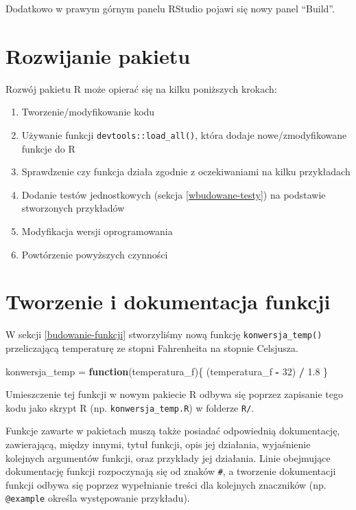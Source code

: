 \documentclass[paper=6in:9in,pagesize=pdftex,headinclude=on,footinclude=on,10pt]{scrbook}
\newenvironment{Shaded}{\begin{snugshade}}{\end{snugshade}}
\newcommand{\ControlFlowTok}[1]{\textcolor[rgb]{0.13,0.29,0.53}{\textbf{#1}}}
\newcommand{\DecValTok}[1]{\textcolor[rgb]{0.00,0.00,0.81}{#1}}
\newcommand{\FloatTok}[1]{\textcolor[rgb]{0.00,0.00,0.81}{#1}}
\newcommand{\NormalTok}[1]{#1}
\newcommand{\OperatorTok}[1]{\textcolor[rgb]{0.81,0.36,0.00}{\textbf{#1}}}
\newcommand{\StringTok}[1]{\textcolor[rgb]{0.31,0.60,0.02}{#1}}
\providecommand{\tightlist}{%
  \setlength{\itemsep}{0pt}\setlength{\parskip}{0pt}}
\begin{document}
Dodatkowo w prawym górnym panelu RStudio pojawi się nowy panel ``Build''.

\hypertarget{rozwijanie-pakietu}{%
\section{Rozwijanie pakietu}\label{rozwijanie-pakietu}}

Rozwój pakietu R może opierać się na kilku poniższych krokach:

\begin{enumerate}
\def\labelenumi{\arabic{enumi}.}
\tightlist
\item
  Tworzenie/modyfikowanie kodu
\item
  Używanie funkcji \texttt{devtools::load\_all()}, która dodaje nowe/zmodyfikowane funkcje do R
\item
  Sprawdzenie czy funkcja działa zgodnie z oczekiwaniami na kilku przykładach
\item
  Dodanie testów jednostkowych (sekcja \ref{wbudowane-testy}) na podstawie stworzonych przykładów
\item
  Modyfikacja wersji oprogramowania
\item
  Powtórzenie powyższych czynności
\end{enumerate}

\hypertarget{tworzenie-i-dokumentacja-funkcji}{%
\section{Tworzenie i dokumentacja funkcji}\label{tworzenie-i-dokumentacja-funkcji}}

W sekcji \ref{budowanie-funkcji} stworzyliśmy nową funkcję \texttt{konwersja\_temp()} przeliczającą temperaturę ze stopni Fahrenheita na stopnie Celsjusza.

\begin{Shaded}
\begin{Highlighting}[]
\NormalTok{konwersja_temp =}\StringTok{ }\ControlFlowTok{function}\NormalTok{(temperatura_f)\{}
\NormalTok{    (temperatura_f }\OperatorTok{-}\StringTok{ }\DecValTok{32}\NormalTok{) }\OperatorTok{/}\StringTok{ }\FloatTok{1.8}
\NormalTok{\}}
\end{Highlighting}
\end{Shaded}

Umieszczenie tej funkcji w nowym pakiecie R odbywa się poprzez zapisanie tego kodu jako skrypt R (np. \texttt{konwersja\_temp.R}) w folderze \texttt{R/}.

Funkcje zawarte w pakietach muszą także posiadać odpowiednią dokumentację, zawierającą, między innymi, tytuł funkcji, opis jej działania, wyjaśnienie kolejnych argumentów funkcji, oraz przykłady jej działania.
Linie obejmujące dokumentację funkcji rozpoczynają się od znaków \texttt{\#\textquotesingle{}}, a tworzenie dokumentacji funkcji odbywa się poprzez wypełnianie treści dla kolejnych znaczników (np. \texttt{@example} określa występowanie przykładu).
\end{document}
